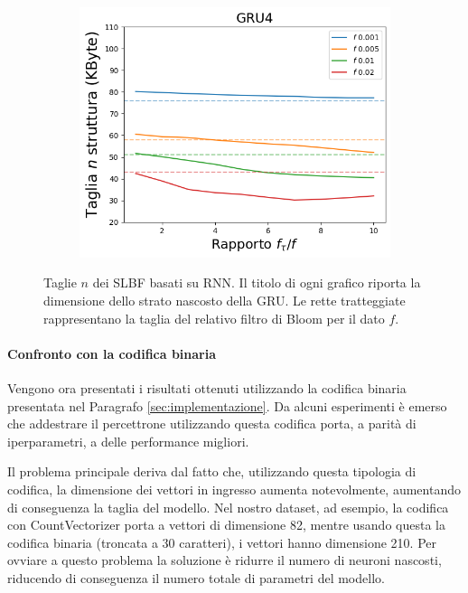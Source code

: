 \documentclass[../../main.tex]{subfiles}
\begin{document}
\begin{figure}[H]
\begin{subfigure}[b]{0.49\textwidth}
            \caption{}
            \label{fig:SLBFTagliaGRU8}
        \end{subfigure}
        \begin{subfigure}[b]{0.49\textwidth}
            \centering
            \includegraphics[width = \textwidth]{immagini/7/SLBF/GRU4_Taglia.png}
            \caption{}
            \label{fig:SLBFTagliaGRU4}
        \end{subfigure}
        \caption{Taglie $n$ dei SLBF basati su RNN. Il titolo di ogni grafico riporta la dimensione dello strato nascosto della GRU. Le rette tratteggiate rappresentano la taglia del relativo filtro di Bloom per il dato $f$.}
        \label{fig:taglieGRUSLBF}
    \end{figure}

    \paragraph{Confronto con la codifica binaria}
    Vengono ora presentati i risultati ottenuti utilizzando la codifica binaria presentata nel Paragrafo \ref{sec:implementazione}. Da alcuni esperimenti è emerso che addestrare il percettrone utilizzando questa codifica porta, a parità di iperparametri, a delle performance migliori. 
    
    Il problema principale deriva dal fatto che, utilizzando questa tipologia di codifica, la dimensione dei vettori in ingresso aumenta notevolmente, aumentando di conseguenza la taglia del modello. Nel nostro dataset, ad esempio, la codifica con CountVectorizer porta a vettori di dimensione 82, mentre usando questa la codifica binaria (troncata a 30 caratteri), i vettori hanno dimensione 210. Per ovviare a questo problema la soluzione è ridurre il numero di neuroni nascosti, riducendo di conseguenza il numero totale di parametri del modello.
\end{document}
